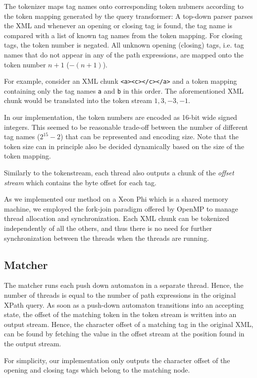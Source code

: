 The tokenizer maps tag names onto corresponding token nubmers according to the
token mapping generated by the query transformer: A top-down parser parses the
XML and whenever an opening or closing tag is found, the tag name is compared
with a list of known tag names from the token mapping. For closing tags, the
token number is negated. All unknown opening (closing) tags, i.e. tag names that
do not appear in any of the path expressions, are mapped onto the token number
$n+1$ ($-(n+1)$).

For example, consider an XML chunk \verb;<a><c></c></a>; and a token mapping
containing only the tag names \verb;a; and \verb;b; in this order. The
aforementioned XML chunk would be translated into the token stream $1, 3, -3,
-1$.

In our implementation, the token numbers are encoded as 16-bit wide signed
integers. This seemed to be reasonable trade-off between the number of different
tag names ($2^15-2$) that can be represented and encoding size. Note that the
token size can in principle also be decided dynamically based on the size of the
token mapping.

Similarly to the tokenstream, each thread also outputs a chunk of the
\emph{offset stream} which contains the byte offset for each tag. 

As we implemented our method on a Xeon Phi  which is a
shared memory machine, we employed the fork-join paradigm offered by OpenMP
 to manage thread allocation and synchronization. Each XML chunk
can be tokenized independently of all the others, and thus there is no need for
further synchronization between the threads when the threads are running.

\subsection{Matcher}

The matcher runs each push down automaton in a separate thread. Hence, the
number of threads is equal to the number of path expressions in the original
XPath query. As soon as a push-down automaton transitions into an accepting
state, the offset of the matching token in the token stream is written into an
output stream. Hence, the character offset of a matching tag in the original
XML, can be found by fetching the value in the offset stream at the position
found in the output stream.

For simplicity, our implementation only outputs the character offset of the
opening and closing tags which belong to the matching node.



